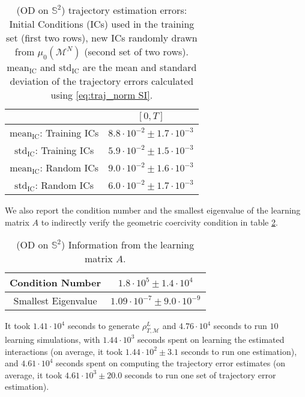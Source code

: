 \documentclass[11pt]{article}
\newcommand{\mM}{\mathcal{M}}
\newcommand{\probIC}{\mu_0}
\newcommand{\muX}{\probIC(\mM^N)}
\begin{document}
\begin{table}[H]
\centering
\small{\begin{tabular}{| c || c |} 
\hline
                                        & $[0, T]$                                \\
\hline
$\text{mean}_{\text{IC}}$: Training ICs & $8.8 \cdot 10^{-2} \pm 1.7 \cdot 10^{-3}$ \\
\hline
$\text{std}_{\text{IC}}$:  Training ICs & $5.9 \cdot 10^{-2} \pm 1.5 \cdot 10^{-3}$ \\
\hline   
\hline         
$\text{mean}_{\text{IC}}$: Random ICs   & $9.0 \cdot 10^{-2} \pm 1.6 \cdot 10^{-3}$ \\
\hline
$\text{std}_{\text{IC}}$:  Random ICs   & $6.0 \cdot 10^{-2} \pm 1.7 \cdot 10^{-3}$ \\
\hline   
\end{tabular}}
\caption{(OD on $\mathbb{S}^2$) trajectory estimation errors: Initial Conditions (ICs) used in the training set (first two rows), new ICs randomly drawn from $\muX$ (second set of two rows).  $\text{mean}_{\text{IC}}$ and $\text{std}_{\text{IC}}$ are the mean and standard deviation of the trajectory errors calculated using \eqref{eq:traj_norm SI}.}
\label{tab:OD_on_S2_traj_err}
\end{table}
We also report the condition number and the smallest eigenvalue of the learning matrix $A$ to indirectly verify the geometric coercivity condition in table \ref{tab:OD_on_S2_coer}.
\begin{table}[H]
\centering
\small{\begin{tabular}{ c || c } 
Condition Number    & $1.8 \cdot 10^{5} \pm 1.4 \cdot 10^{4}$ \\ 
\hline
Smallest Eigenvalue & $1.09 \cdot 10^{-7} \pm 9.0 \cdot 10^{-9}$
\end{tabular}}
\caption{(OD on $\mathbb{S}^2$) Information from the learning matrix $A$.}
\label{tab:OD_on_S2_coer}
\end{table}
It took $1.41 \cdot 10^{4}$ seconds to generate $\rho_{T, \mM}^L$ and $4.76 \cdot 10^{4}$ seconds to run $10$ learning simulations, with $1.44 \cdot 10^{3}$ seconds spent on learning the estimated interactions (on average, it took $1.44 \cdot 10^{2} \pm 3.1$ seconds to run one estimation), and $4.61 \cdot 10^{4}$ seconds spent on computing the trajectory error estimates (on average, it took $4.61 \cdot 10^{3} \pm 20.0$ seconds to run one set of trajectory error estimation).
\end{document}

